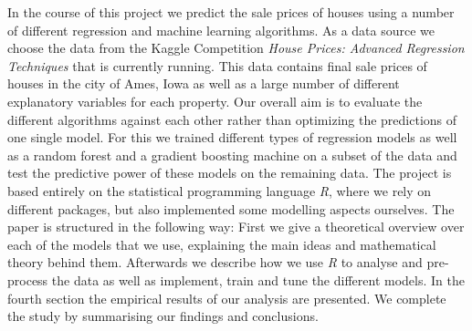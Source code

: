 In the course of this project we predict the sale prices of houses using a number of different regression and machine learning algorithms. As a data source we choose the data from the Kaggle Competition \textit{House Prices: Advanced Regression Techniques} that is currently running. This data contains final sale prices of houses in the city of Ames, Iowa as well as a large number of different explanatory variables for each property. Our overall aim is to evaluate the different algorithms against each other rather than optimizing the predictions of one single model. For this we trained different types of regression models as well as a random forest and a gradient boosting machine on a subset of the data and test the predictive power of these models on the remaining data. The project is based entirely on the statistical programming language \textit{R}, where we rely on different packages, but also implemented some modelling aspects ourselves. The paper is structured in the following way: First we give a theoretical overview over each of the models that we use, explaining the main ideas and mathematical theory behind them. Afterwards we describe how we use \textit{R} to  analyse and pre-process the data as well as implement, train and tune the different models. In the fourth section the empirical results of our analysis are presented. We complete the study by summarising our findings and conclusions. 